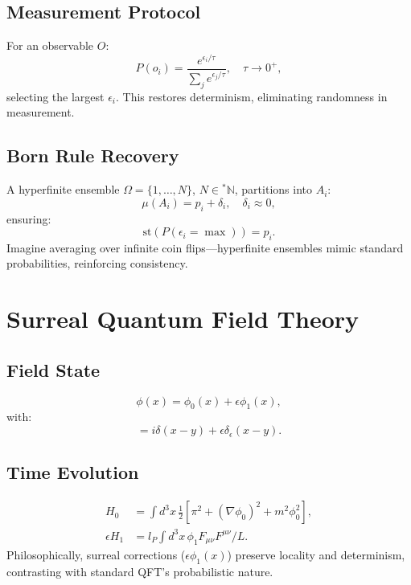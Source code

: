 \documentclass{article}
\begin{document}
\subsection{Measurement Protocol}
For an observable \(O\):
\begin{equation}
P(o_i) = \frac{e^{\epsilon_i / \tau}}{\sum_j e^{\epsilon_j / \tau}}, \quad \tau \to 0^+,
\end{equation}
selecting the largest \(\epsilon_i\). This restores determinism, eliminating randomness in measurement.

\subsection{Born Rule Recovery}
A hyperfinite ensemble \(\Omega = \{1, \dots, N\}\), \(N \in {}^*\mathbb{N}\), partitions into \(A_i\):
\begin{equation}
\mu(A_i) = p_i + \delta_i, \quad \delta_i \approx 0,
\end{equation}
ensuring:
\begin{equation}
\text{st}(P(\epsilon_i = \max)) = p_i.
\end{equation}
Imagine averaging over infinite coin flips—hyperfinite ensembles mimic standard probabilities, reinforcing consistency.

\section{Surreal Quantum Field Theory}
\subsection{Field State}
\begin{equation}
\phi(x) = \phi_0(x) + \epsilon \phi_1(x),
\end{equation}
with:
\begin{equation}
[\phi(x), \pi(y)] = i \delta(x-y) + \epsilon \delta_\epsilon(x-y).
\end{equation}

\subsection{Time Evolution}
\begin{align}
H_0 &= \int d^3x \, \frac{1}{2} [\pi^2 + (\nabla \phi_0)^2 + m^2 \phi_0^2], \\
\epsilon H_1 &= l_P \int d^3x \, \phi_1 F_{\mu\nu} F^{\mu\nu} / L.
\end{align}
Philosophically, surreal corrections (\(\epsilon \phi_1(x)\)) preserve locality and determinism, contrasting with standard QFT's probabilistic nature.
\end{document}
